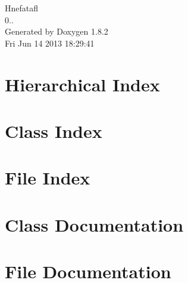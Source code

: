 \documentclass{book}
\begin{document}
\hypersetup{pageanchor=false,citecolor=blue}
\begin{titlepage}
\vspace*{7cm}
\begin{center}
{\Large Hnefatafl \\[1ex]\large 0.. }\\
\vspace*{1cm}
{\large Generated by Doxygen 1.8.2}\\
\vspace*{0.5cm}
{\small Fri Jun 14 2013 18:29:41}\\
\end{center}
\end{titlepage}
\clearemptydoublepage
{}
\tableofcontents
\clearemptydoublepage
{}
\hypersetup{pageanchor=true,citecolor=blue}
\chapter{Hierarchical Index}

\chapter{Class Index}

\chapter{File Index}

\chapter{Class Documentation}










\chapter{File Documentation}
















\printindex
\end{document}
